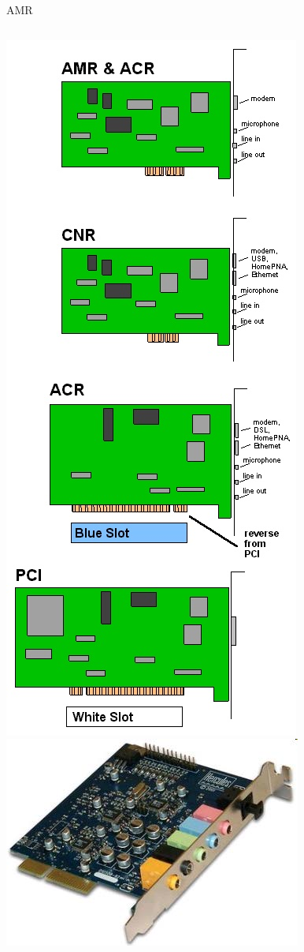 \documentclass[aspectratio=43]{beamer}
\begin{document}
\begin{frame}{AMR}
	\begin{columns}
		\includegraphics[width=0.65\linewidth]{extrahovane_obrazky/AMR_p.jpg}
		\includegraphics[width=1\linewidth]{extrahovane_obrazky/img_1_page25_1.jpeg}
	\end{columns}
\end{frame}
\end{document}
